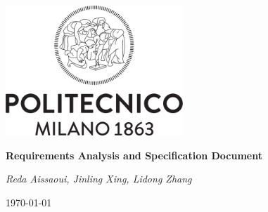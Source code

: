 \begin{titlepage}
\centering
\includegraphics[width=0.50\textwidth]{RASD/resources/logo_polimi.png}\par
\vspace{1.5cm}
{\LARGE \textbf{Requirements Analysis and Specification Document} \par}
\vspace{0.2cm}
{\large {}\par}
\vspace{1.0cm}
{\large\itshape Reda Aissaoui,  Jinling Xing,  Lidong Zhang\par}
\vspace{2cm}
\vfill
{\large \today \par}
\end{titlepage}
